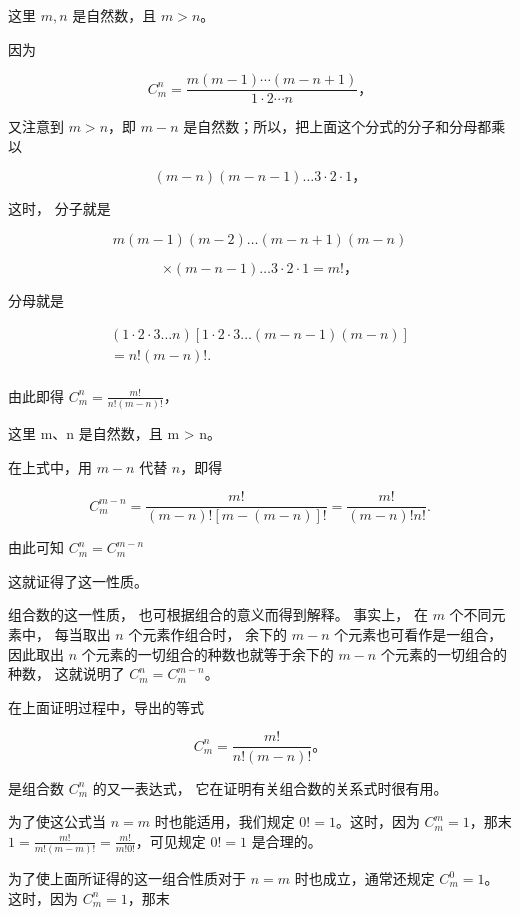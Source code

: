 这里 \(m, n\) 是自然数，且 \(m > n\)。

 因为

\[
C _ {m} ^ {n} = \frac {m (m - 1) \cdots (m - n + 1)}{1 \cdot 2 \cdots n}\text{，}
\]

又注意到 \(m > n\)，即 \(m - n\)
是自然数；所以，把上面这个分式的分子和分母都乘以

\[
(m - n) (m - n - 1) \dots 3 \cdot 2 \cdot 1\text{，}
\]

这时， 分子就是

\[
m (m - 1) (m - 2) \dots (m - n + 1) (m - n)
\]

\[
\times (m - n - 1) \dots 3 \cdot 2 \cdot 1 = m!\text{，}
\]

分母就是

\[
\begin{array}{l} (1 \cdot 2 \cdot 3 \dots n) [ 1 \cdot 2 \cdot 3 \dots (m - n - 1) (m - n) ] \\ = n! (m - n)!. \\ \end{array}
\]

由此即得 \(C_m^n=\frac{m!}{n!(m-n)!}\)，

这里 m、n 是自然数，且 m \textgreater{} n。

在上式中，用 \(m - n\) 代替 \(n\)，即得

\[
C _ {m} ^ {m - n} = \frac {m !}{(m - n) ! [ m - (m - n) ] !} = \frac {m !}{(m - n) ! n !}.
\]

由此可知 \(C_m^n=C_m^{m-n}\)

这就证得了这一性质。


组合数的这一性质， 也可根据组合的意义而得到解释。 事实上， 在 \(m\)
个不同元素中， 每当取出 \(n\) 个元素作组合时， 余下的 \(m - n\)
个元素也可看作是一组合， 因此取出 \(n\)
个元素的一切组合的种数也就等于余下的 \(m - n\) 个元素的一切组合的种数，
这就说明了 \(C_{m}^{n} = C_{m}^{m - n}\)。

在上面证明过程中，导出的等式

\[
C_m^n=\frac{m!}{n!(m-n)!}\text{。}
\]

是组合数 \(C_m^n\) 的又一表达式， 它在证明有关组合数的关系式时很有用。

为了使这公式当 \(n = m\) 时也能适用，我们规定 \(0! = 1\)。这时，因为
\(C_m^m=1\)，那末
\(1 = \frac{m!}{m!(m - m)!} = \frac{m!}{m!0!}\)，可见规定 \(0! = 1\)
是合理的。

为了使上面所证得的这一组合性质对于 \(n = m\) 时也成立，通常还规定
\(C_m^0=1\)。这时，因为 \(C_m^n = 1\)，那末


